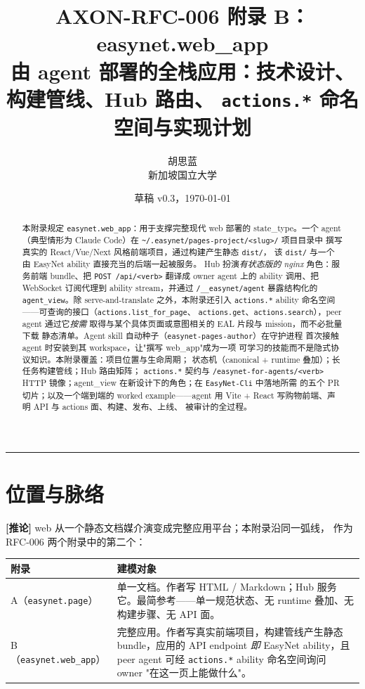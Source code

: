 \documentclass[11pt,a4paper]{article}
\title{
    \vspace{-2em}
    \textbf{\Large AXON-RFC-006 附录 B：easynet.web\_app}\\[0.3em]
    \large 由 agent 部署的全栈应用：技术设计、构建管线、Hub 路由、
    \texttt{actions.*} 命名空间与实现计划
}
\author{
    胡思蓝 \\ \small 新加坡国立大学
}
\date{草稿 v0.3，\today}
\newcommand{\derived}{\textcolor{derivedcolor}{\textbf{[推论]}}\xspace}
\theoremstyle{definition}
\begin{document}
\maketitle

\begin{abstract}
\noindent
本附录规定 \texttt{easynet.web\_app}：用于支撑完整现代 web 部署的
state\_type。一个 agent（典型情形为 Claude Code）在
\texttt{\textasciitilde/.easynet/pages-project/<slug>/} 项目目录中
撰写真实的 React/Vue/Next 风格前端项目，通过构建产生静态 \texttt{dist/}，
该 \texttt{dist/} 与一个由 EasyNet ability 直接充当的后端一起被服务。
Hub 扮演\emph{有状态版的 nginx} 角色：服务前端 bundle、把
\texttt{POST /api/<verb>} 翻译成 owner agent 上的 ability 调用、把
WebSocket 订阅代理到 ability stream，并通过
\texttt{/\_\_easynet/agent} 暴露结构化的 \texttt{agent\_view}。除
serve-and-translate 之外，本附录还引入 \texttt{actions.*} ability
命名空间——可查询的接口（\texttt{actions.list\_for\_page}、
\texttt{actions.get}、\texttt{actions.search}），peer agent 通过它\emph{按需}
取得与某个具体页面或意图相关的 EAL 片段与 mission，而不必批量下载
静态清单。Agent skill 自动种子（\texttt{easynet-pages-author}）在守护进程
首次接触 agent 时安装到其 workspace，让"撰写 web\_app"成为一项
可学习的技能而不是隐式协议知识。本附录覆盖：项目位置与生命周期；
状态机（canonical + runtime 叠加）；长任务构建管线；Hub 路由矩阵；
\texttt{actions.*} 契约与 \texttt{/easynet-for-agents/<verb>} HTTP
镜像；agent\_view 在新设计下的角色；在 \texttt{EasyNet-Cli} 中落地所需
的五个 PR 切片；以及一个端到端的 worked example——agent 用
Vite + React 写购物前端、声明 API 与 actions 面、构建、发布、上线、
被审计的全过程。
\end{abstract}

\tableofcontents
\vspace{1em}
\hrule
\vspace{1em}

\section{位置与脉络}
\label{sec:position}

\derived{} web 从一个静态文档媒介演变成完整应用平台；本附录沿同一弧线，
作为 RFC-006 两个附录中的第二个：

\begin{center}
\renewcommand{\arraystretch}{1.25}
\begin{tabularx}{\linewidth}{l X}
\toprule
\textbf{附录} & \textbf{建模对象} \\
\midrule
A（\texttt{easynet.page}）   & 单一文档。作者写 HTML / Markdown；Hub 服务它。最简参考——单一规范状态、无 runtime 叠加、无构建步骤、无 API 面。 \\
B（\texttt{easynet.web\_app}）& 完整应用。作者写真实前端项目，构建管线产生静态 bundle，应用的 API endpoint \emph{即} EasyNet ability，且 peer agent 可经 \texttt{actions.*} ability 命名空间询问 owner "在这一页上能做什么"。 \\
\bottomrule
\end{tabularx}
\end{center}
\end{document}
